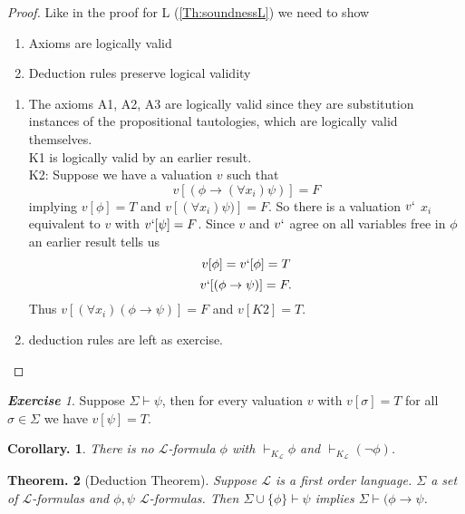 \documentclass[a4paper,oneside,11pt,DIV=12,parskip=half]{scrartcl}
\newcommand{\LL}{\mathcal L}
\theoremstyle{plain}
\newtheorem{theorem}{Theorem.}[section]
\newtheorem{corollary}[theorem]{Corollary.}
\theoremstyle{definition}
\newtheorem{remark, definition}[theorem]{Remark and Definition.}
\newtheorem{lemma, definition}[theorem]{Lemma and Definition.}
\newtheorem{theorem, definition}[theorem]{Theorem and Definition.}
\theoremstyle{remark}
\newtheorem*{exercise}{\textbf{Exercise}}
\newtheorem*{remark, example}{\textbf{Remark and Exercise}}
\begin{document}
\begin{proof}
Like in the proof for L (\ref{Th:soundnessL}) we need to show
\begin{enumerate}
    \item Axioms are logically valid
    \item Deduction rules preserve logical validity
\end{enumerate}

\begin{enumerate}
    \item The axioms A1, A2, A3 are logically valid since they are substitution instances of the propositional tautologies, which are logically valid themselves.\\
    K1 is logically valid by an earlier result.\\
    K2: Suppose we have a valuation $v$ such that 
        \[ v[(\phi \rightarrow (\forall x_i)\psi)] = F \]
    implying $v[\phi] = T$ and $v[(\forall x_i)\psi)] = F$.
    So there is a valuation $v`$ $x_i$ equivalent to $v$ with $v`[\psi] = F$. Since $v$ and $v`$ agree on all variables free in $\phi$ an earlier result tells us 
    \[ v[\phi] = v`[\phi] = T \]
    \[ v`[(\phi \rightarrow \psi)] = F. \]
    Thus $v[(\forall x_i)(\phi \rightarrow \psi)] = F$ and
    $v[K2] = T$.
    \item deduction rules are left as exercise.
\end{enumerate}
\end{proof}
\begin{exercise}
    Suppose $\Sigma \vdash \psi$, then for every valuation $v$ with $v[\sigma] = T$ for all $\sigma \in \Sigma$ we have $v[\psi] = T$.
\end{exercise}

\begin{corollary}
 There is no $\LL$-formula $\phi$ with $\vdash_{K_\LL} \phi$ and $\vdash_{K_\LL} (\lnot \phi)$.
\end{corollary}

\begin{theorem}[Deduction Theorem]\label{Th:deduction}
Suppose $\LL$ is a first order language. $\Sigma$ a set of $\LL$-formulas and $\phi,\psi$ $\LL$-formulas. Then $\Sigma \cup \{ \phi \} \vdash \psi$ implies $\Sigma \vdash (\phi \rightarrow \psi$.
\end{theorem}
\end{document}
